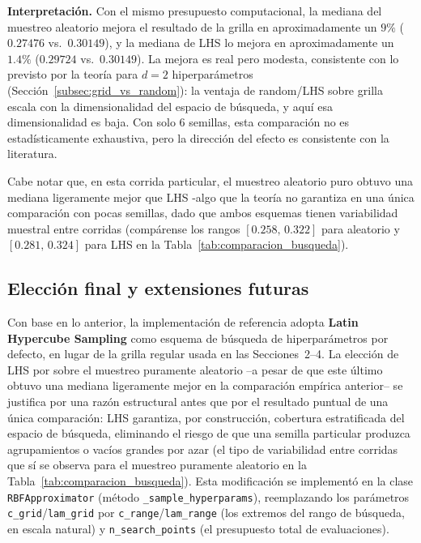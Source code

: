 \documentclass[11pt,a4paper]{article}
\begin{document}
\textbf{Interpretaci\'on.} Con el mismo presupuesto computacional, la mediana
del muestreo aleatorio mejora el resultado de la grilla en
aproximadamente un $9\%$ ($0.27476$ vs.\ $0.30149$), y la mediana de LHS lo
mejora en aproximadamente un $1.4\%$ ($0.29724$ vs.\ $0.30149$). La mejora es
real pero modesta, consistente con lo previsto por la teor\'ia para $d=2$
hiperpar\'ametros (Secci\'on~\ref{subsec:grid_vs_random}): la ventaja de
random/LHS sobre grilla escala con la dimensionalidad del espacio de
b\'usqueda, y aqu\'i esa dimensionalidad es baja. Con solo $6$ semillas, esta
comparaci\'on no es estad\'isticamente exhaustiva, pero la direcci\'on del
efecto es consistente con la literatura.

Cabe notar que, en esta corrida particular, el muestreo aleatorio puro obtuvo
una mediana ligeramente mejor que LHS -algo que la teor\'ia no garantiza en
una \'unica comparaci\'on con pocas semillas, dado que ambos esquemas tienen
variabilidad muestral entre corridas (compárense los rangos
$[0.258,\,0.322]$ para aleatorio y $[0.281,\,0.324]$ para LHS en la
Tabla~\ref{tab:comparacion_busqueda}).

\subsection{Elecci\'on final y extensiones futuras}
\label{subsec:eleccion_final}

Con base en lo anterior, la implementaci\'on de referencia adopta
\textbf{Latin Hypercube Sampling} como esquema de b\'usqueda de
hiperpar\'ametros por defecto, en lugar de la grilla regular usada en las
Secciones~2--4. La elecci\'on de LHS por sobre el muestreo puramente aleatorio
--a pesar de que este \'ultimo obtuvo una mediana ligeramente mejor en la
comparaci\'on emp\'irica anterior-- se justifica por una raz\'on estructural
antes que por el resultado puntual de una \'unica comparaci\'on: LHS garantiza,
por construcci\'on, cobertura estratificada del espacio de b\'usqueda,
eliminando el riesgo de que una semilla particular produzca agrupamientos o
vac\'ios grandes por azar (el tipo de variabilidad entre corridas que s\'i se
observa para el muestreo puramente aleatorio en la
Tabla~\ref{tab:comparacion_busqueda}). Esta modificaci\'on se implement\'o en
la clase \texttt{RBFApproximator} (m\'etodo \texttt{\_sample\_hyperparams}),
reemplazando los par\'ametros \texttt{c\_grid}/\texttt{lam\_grid} por
\texttt{c\_range}/\texttt{lam\_range} (los extremos del rango de b\'usqueda,
en escala natural) y \texttt{n\_search\_points} (el presupuesto total de
evaluaciones).
\end{document}
